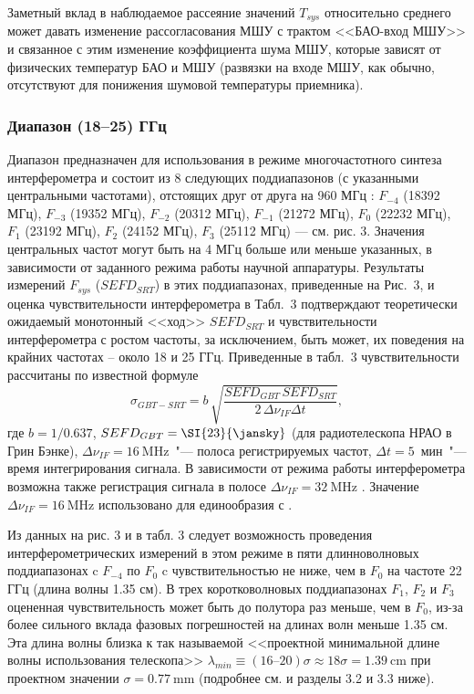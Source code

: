 Заметный вклад в наблюдаемое рассеяние значений $T_{sys}$ относительно среднего может давать
изменение рассогласования МШУ с трактом <<БАО-вход МШУ>> и связанное с этим изменение коэффициента
шума МШУ, которые зависят от физических температур БАО и МШУ (развязки на входе МШУ, как обычно,
отсутствуют для понижения шумовой температуры приемника).

\subsubsection{Диапазон (18--25) ГГц}

Диапазон предназначен для использования в режиме многочастотного синтеза интерферометра и состоит из
8 следующих поддиапазонов (с указанными центральными частотами), отстоящих друг от друга на 960 МГц
\cite{Kardashev_2013_rus}: $F_{-4}$ (18392 МГц), $F_{-3}$ (19352 МГц), $F_{-2}$ (20312 МГц),
$F_{-1}$ (21272 МГц), $F_0$ (22232 МГц), $F_1$ (23192 МГц),  $F_2$ (24152 МГц), $F_3$ (25112 МГц)
--- см. рис. 3. Значения центральных частот могут быть на 4 МГц больше или меньше указанных, в
зависимости от заданного режима работы научной аппаратуры. Результаты измерений $F_{sys}$
($SEFD_{SRT}$) в этих поддиапазонах, приведенные на Рис.~3, и оценка чувствительности интерферометра
в Табл.~3 подтверждают теоретически ожидаемый монотонный <<ход>> $SEFD_{SRT}$ и чувствительности
интерферометра с ростом частоты, за исключением, быть может, их поведения на крайних частотах --
около 18 и 25 ГГц. Приведенные в табл.~3 чувствительности  рассчитаны по известной формуле
\cite{Kardashev_2013_rus}
\[
\sigma_{GBT-SRT} = b\, \sqrt{\frac {SEFD_{GBT}\, SEFD_{SRT}}{2\, \Delta \nu_{IF} \Delta t}},
\]
\noindent
где $b = 1/0.637$, $SEFD_{GBT} = \SI{23}{\jansky}$ (для радиотелескопа НРАО в Грин Бэнке), $\Delta
\nu_{IF} = \SI{16}{\MHz}$~"--- полоса регистрируемых частот, $\Delta t = 5$~мин~"--- время
интегрирования сигнала. В зависимости от режима работы интерферометра возможна также регистрация
сигнала в полосе $\Delta\nu_{IF} = \SI{32}{\MHz}$ \cite{Kardashev_2013_rus}. Значение
$\Delta\nu_{IF} = \SI{16}{\MHz}$ использовано для единообразия с \cite{RAUH}.

Из данных на рис. 3 и в табл. 3 следует возможность проведения интерферометрических измерений в этом
режиме в пяти длинноволновых поддиапазонах c $F_{-4}$ по $F_0$ c чувствительностью не ниже, чем в
$F_0$ на частоте 22 ГГц (длина волны 1.35 см). В трех коротковолновых поддиапазонах $F_1$, $F_2$ и
$F_3$ оцененная чувствительность может быть до полутора раз меньше, чем в $F_0$, из-за более
сильного вклада фазовых погрешностей на длинах волн меньше 1.35 см. Эта длина волны близка к так
называемой <<проектной минимальной длине волны использования телескопа>> $\lambda_{min} \equiv
(16\text{--}20)\sigma \approx 18\sigma= \SI{1.39}{\cm}$ при проектном значении $\sigma =
\SI{0.77}{\mm}$ (подробнее см. \cite{Esepkina_1973,Kuhn_1967,Cejtlin_1976} и разделы 3.2 и 3.3
ниже).

